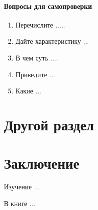 \documentclass[14pt, openany, twoside, final]{extbook} %
\newenvironment{questions}{\subsubsection*{Вопросы для самопроверки}\begin{enumerate}\itemsep0pt minus 0.3pt\parskip0pt plus 0.3pt}{\end{enumerate}}
\begin{document}
\begin{questions}
\item{} Перечислите .....
\item{} Дайте характеристику ...
\item{} В чем суть ....
\item{} Приведите ...
\item{} Какие ...
\end{questions}

\chapter{Другой раздел}


\chapter*{Заключение}


Изучение ...

В книге ...
\end{document}
